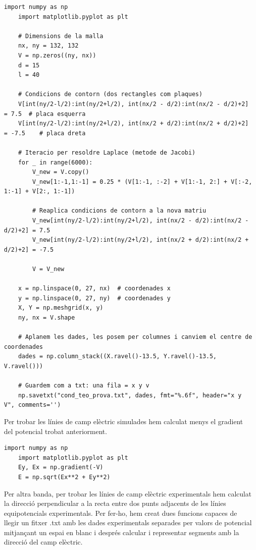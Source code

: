 \documentclass[11pt]{article}
\begin{document}
\begin{lstlisting}[caption={Simulació del potencial}, label={lst:simulacio}]
    import numpy as np
    import matplotlib.pyplot as plt

    # Dimensions de la malla
    nx, ny = 132, 132
    V = np.zeros((ny, nx))
    d = 15
    l = 40

    # Condicions de contorn (dos rectangles com plaques)
    V[int(ny/2-l/2):int(ny/2+l/2), int(nx/2 - d/2):int(nx/2 - d/2)+2] = 7.5  # placa esquerra
    V[int(ny/2-l/2):int(ny/2+l/2), int(nx/2 + d/2):int(nx/2 + d/2)+2] = -7.5    # placa dreta

    # Iteracio per resoldre Laplace (metode de Jacobi)
    for _ in range(6000):
        V_new = V.copy()
        V_new[1:-1,1:-1] = 0.25 * (V[1:-1, :-2] + V[1:-1, 2:] + V[:-2, 1:-1] + V[2:, 1:-1])
        
        # Reaplica condicions de contorn a la nova matriu
        V_new[int(ny/2-l/2):int(ny/2+l/2), int(nx/2 - d/2):int(nx/2 - d/2)+2] = 7.5
        V_new[int(ny/2-l/2):int(ny/2+l/2), int(nx/2 + d/2):int(nx/2 + d/2)+2] = -7.5
        
        V = V_new

    x = np.linspace(0, 27, nx)  # coordenades x
    y = np.linspace(0, 27, ny)  # coordenades y
    X, Y = np.meshgrid(x, y)
    ny, nx = V.shape

    # Aplanem les dades, les posem per columnes i canviem el centre de coordenades
    dades = np.column_stack((X.ravel()-13.5, Y.ravel()-13.5, V.ravel()))

    # Guardem com a txt: una fila = x y v
    np.savetxt("cond_teo_prova.txt", dades, fmt="%.6f", header="x y V", comments='')
\end{lstlisting}
Per trobar les línies de camp elèctric simulades hem calculat menys el gradient del potencial trobat anteriorment.
\begin{lstlisting}[caption={Simulació del camp elèctric}, label={lst:simulacio_camp}]
    import numpy as np
    import matplotlib.pyplot as plt
    Ey, Ex = np.gradient(-V)
    E = np.sqrt(Ex**2 + Ey**2)    
\end{lstlisting}

Per altra banda, per trobar les línies de camp elèctric experimentals hem calculat la direcció perpendicular a la recta entre dos punts adjacents de les línies equipotencials experimentals. Per fer-ho, hem creat dues funcions capaces de llegir un fitxer .txt amb les dades experimentals separades per valors de potencial mitjançant un espai en blanc i després calcular i representar segments amb la direcció del camp elèctric.
\end{document}
